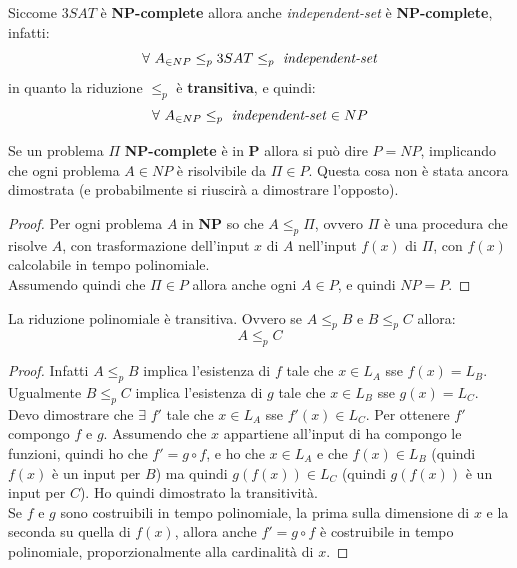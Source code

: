 								Siccome $3SAT$ è \textbf{NP-complete} allora anche \textit{independent-set} è
								\textbf{NP-complete}, infatti:
								\[\forall\,\, A_{\in NP}\leq_p 3SAT\leq_p \mbox{ \textit{independent-set}}\]
								in quanto la riduzione $\leq_p$ è \textbf{transitiva}, e quindi:
								\[\forall\,\, A_{\in NP}\leq_p \mbox{ \textit{independent-set}}\in NP\]
								\begin{definizione}
									Se un problema $\Pi$ \textbf{NP-complete} è in \textbf{P} allora si può dire
									$P=NP$, implicando che ogni problema $A\in NP$ è risolvibile da $\Pi\in P$.
									Questa cosa non è stata ancora dimostrata (e probabilmente si riuscirà
									a dimostrare l'opposto).
								\end{definizione}
								\begin{proof}
									Per ogni problema $A$ in \textbf{NP} so che $A\leq_p \Pi$, ovvero $\Pi$ è una
									procedura che risolve $A$, con trasformazione dell'input $x$ di $A$ nell'input
									$f(x)$ di $\Pi$, con $f(x)$ calcolabile in tempo polinomiale.\\
									Assumendo quindi che $\Pi\in P$ allora anche ogni $A\in P$, e quindi $NP=P$.
								\end{proof}
								\begin{definizione}
									La riduzione polinomiale è transitiva. Ovvero se $A\leq_p B$ e $B\leq_p C$
									allora:
									\[A\leq_p C\]
								\end{definizione}
								\begin{proof}
									Infatti $A\leq_p B$ implica l'esistenza di $f$ tale che $x\in L_A$ sse
									$f(x)=L_B$. Ugualmente $B\leq_p C$ implica l'esistenza di $g$ tale che $x\in
									L_B$ sse $g(x)=L_C$.\\
									Devo dimostrare che $\exists\,\,f'$ tale che $x\in L_A$ sse $f'(x)\in
									L_C$. Per ottenere $f'$ compongo $f$ e $g$. Assumendo che $x$ appartiene
									all'input di ha compongo le funzioni, quindi ho che $f'=g\circ f$,
									e ho che $x\in L_A$ e che $f(x)\in L_B$ (quindi $f(x)$ è un input per $B$) ma
									quindi $g(f(x))\in L_C$ (quindi $g(f(x))$ è un input per $C$). Ho quindi
									dimostrato la transitività.\\
									Se $f$ e $g$ sono costruibili in tempo polinomiale, la prima sulla dimensione
									di $x$ e la seconda su quella di $f(x)$, allora anche $f'=g\circ f$
									è costruibile in tempo polinomiale, proporzionalmente alla cardinalità di $x$.
								\end{proof}
